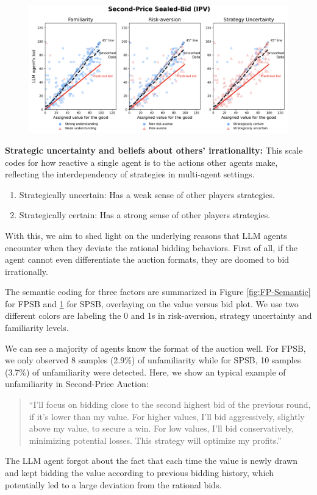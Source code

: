 \documentclass{article} %
\begin{document}
\begin{figure}[h]
    \centering \includegraphics[width=\linewidth]{Figs/Second_semantic.png}
    \caption{ }
    \label{fig:SP-Semantic}
\end{figure}

\textbf{Strategic uncertainty and beliefs about others' irrationality:} This scale codes for how reactive a single agent is to the actions other agents make, reflecting the interdependency of strategies in multi-agent settings.

\begin{enumerate}
    \item[0.] Strategically uncertain: Has a weak sense of other players strategies.
    \item[1.] Strategically certain: Has a strong sense of other players strategies.
\end{enumerate}


With this, we aim to shed light on the underlying reasons that LLM agents encounter when they deviate the rational bidding behaviors.
First of all, if the agent cannot even differentiate the auction formats, they are doomed to bid irrationally. 

The semantic coding for three factors are summarized in Figure \ref{fig:FP-Semantic} for FPSB and \ref{fig:SP-Semantic} for SPSB, overlaying on the value versus bid plot. 
We use two different colors are labeling the 0 and 1s in risk-aversion, strategy uncertainty and familiarity levels.

We can see a majority of agents know the format of the auction well. 
For FPSB, we only observed 8 samples (2.9\%) of unfamiliarity while for SPSB, 10 samples (3.7\%) of unfamiliarity were detected. 
Here, we show an typical example of unfamiliarity in Second-Price Auction:
\begin{quote}
    ``I'll focus on bidding close to the second highest bid of the previous round, if it's lower than my value. For higher values, I'll bid aggressively, slightly above my value, to secure a win. For low values, I'll bid conservatively, minimizing potential losses. This strategy will optimize my profits.''
\end{quote}
The LLM agent forgot about the fact that each time the value is newly drawn and kept bidding the value according to previous bidding history, which potentially led to a large deviation from the rational bids.
\end{document}
